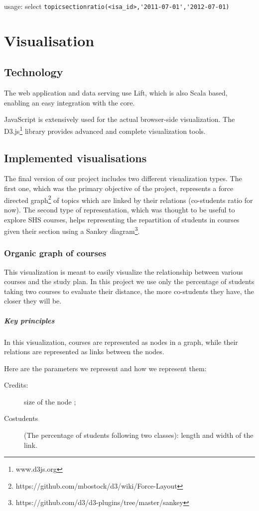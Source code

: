 usage: select \verb|topicsectionratio(<isa_id>,'2011-07-01','2012-07-01)|

\chapter{Visualisation}

\section{Technology}
The web application and data serving use Lift, which is also Scala based, enabling an easy integration with the core.

JavaScript is extensively used for the actual browser-side visualization. The D3.js\footnote{www.d3js.org} library provides advanced and complete visualization tools. 

\section{Implemented visualisations}
The final version of our project includes two different visualization types. The first one, which was the primary objective of the project, represents a force directed graph\footnote{https://github.com/mbostock/d3/wiki/Force-Layout} of topics which are linked by their relations (co-students ratio for now). The second type of representation, which was thought to be useful to explore SHS courses, helps representing the repartition of students in courses given their section using a Sankey diagram\footnote{https://github.com/d3/d3-plugins/tree/master/sankey}. 

\subsection{Organic graph of courses}
This visualization is meant to easily visualize the relationship between various courses and the study plan. In this project we use only the percentage of students taking two courses to evaluate their distance, the more co-students they have, the closer they will be.  

\paragraph{Key principles}
In this visualization, courses are represented as nodes in a graph, while their relations are represented as links between the nodes. 

Here are the parameters we represent and how we represent them: 
\begin{description}
\item[Credits:] size of the node ;
\item[Costudents] (The percentage of students following two classes): length and width of the link.
\end{description}

